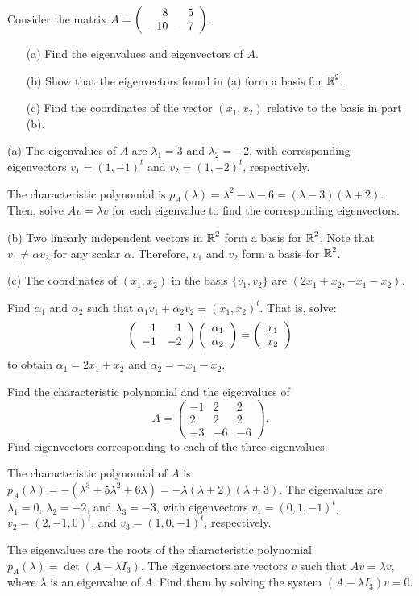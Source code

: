 \documentclass{ximera}
\begin{document}
\begin{exercise} \label{c10.2.4}
Consider the matrix $A=\left(\begin{array}{rr} 8 & 5\\ -10 &-7\end{array}\right)$.
\begin{itemize}
\item[(a)] Find the eigenvalues and eigenvectors of $A$.
\item[(b)] Show that the eigenvectors found in (a) form a basis for $\mbox{$\Bbb{R}$}^2$.
\item[(c)] Find the coordinates of the vector $(x_1,x_2)$ relative to the 
basis in part (b).
\end{itemize}

\begin{solution}

(a) \ans The eigenvalues of $A$ are $\lambda_1 = 3$ and $\lambda_2 = -2$,
with corresponding eigenvectors $v_1 = (1,-1)^t$ and
$v_2 = (1,-2)^t$, respectively.

\soln The characteristic polynomial is $p_A(\lambda) =
\lambda^2 - \lambda - 6 = (\lambda - 3)(\lambda + 2)$.  Then, solve
$Av = \lambda v$ for each eigenvalue to find the corresponding eigenvectors.

(b) Two linearly independent vectors in $\mbox{$\Bbb{R}$}^2$ form a basis for $\mbox{$\Bbb{R}$}^2$.
Note that $v_1 \neq \alpha v_2$ for any scalar $\alpha$.  Therefore,
$v_1$ and $v_2$ form a basis for $\mbox{$\Bbb{R}$}^2$.

(c) \ans The coordinates of $(x_1,x_2)$ in the basis $\{v_1,v_2\}$ are
$(2x_1 + x_2, -x_1 - x_2)$. 

\soln Find $\alpha_1$ and $\alpha_2$ such that $\alpha_1v_1 +
\alpha_2v_2 = (x_1,x_2)^t$.  That is, solve:
\[
\left(\begin{array}{rr} 1 & 1\\ -1 &-2\end{array}\right)\left(\begin{array}{r} \alpha_1 \\ \alpha_2\end{array}\right) = \left(\begin{array}{r} x_1 \\ x_2\end{array}\right)
\]
to obtain $\alpha_1 = 2x_1 + x_2$ and $\alpha_2 = -x_1 - x_2$.

\end{solution}
\end{exercise}

\begin{exercise} \label{c10.2.5}
Find the characteristic polynomial and the eigenvalues of 
\[
A = \left(\begin{array}{rrr} -1 & 2 & 2 \\ 2 & 2 & 2 \\ -3 & -6 & -6 
\end{array}\right).
\]
Find eigenvectors corresponding to each of the three eigenvalues.

\begin{solution}

\ans The characteristic polynomial of $A$ is $p_A(\lambda) = -(\lambda^3
+ 5\lambda^2 + 6\lambda) = -\lambda(\lambda + 2)(\lambda + 3)$. 
The eigenvalues are $\lambda_1 = 0$, $\lambda_2 = -2$, and $\lambda_3 = -3$,
with eigenvectors $v_1 = (0,1,-1)^t$, $v_2 = (2,-1,0)^t$, and 
$v_3 = (1,0,-1)^t$, respectively.

\soln The eigenvalues are the roots of the characteristic polynomial
$p_A(\lambda) = \det(A - \lambda I_3)$.  The eigenvectors are vectors
$v$ such that $Av = \lambda v$, where $\lambda$ is an eigenvalue of
$A$.  Find them by solving the system $(A - \lambda I_3)v = 0$.

\end{solution}
\end{exercise}
\end{document}
